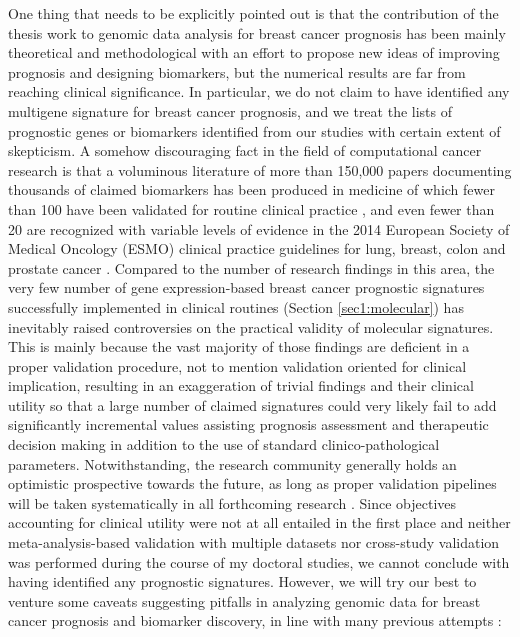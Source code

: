One thing that needs to be explicitly pointed out is that the contribution of the thesis work to genomic data analysis for breast cancer prognosis has been mainly theoretical and methodological with an effort to propose new ideas of improving prognosis and designing biomarkers, but the numerical results are far from reaching clinical significance. In particular, we do not claim to have identified any multigene signature for breast cancer prognosis, and we treat the lists of prognostic genes or biomarkers identified from our studies with certain extent of skepticism. A somehow discouraging fact in the field of computational cancer research is that a voluminous literature of more than 150,000 papers documenting thousands of claimed biomarkers has been produced in medicine of which fewer than 100 have been validated for routine clinical practice \cite{Poste2011Bring}, and even fewer than 20 are recognized with variable levels of evidence in the 2014 European Society of Medical Oncology (ESMO) clinical practice guidelines for lung, breast, colon and prostate cancer \cite{Schneider2015Establishing}. Compared to the number of research findings in this area, the very few number of gene expression-based breast cancer prognostic signatures successfully implemented in clinical routines (Section \ref{sec1:molecular}) has inevitably raised controversies on the practical validity of molecular signatures. This is mainly because the vast majority of those findings are deficient in a proper validation procedure, not to mention validation oriented for clinical implication, resulting in an exaggeration of trivial findings and their clinical utility so that a large number of claimed signatures could very likely fail to add significantly incremental values assisting prognosis assessment and therapeutic decision making in addition to the use of standard clinico-pathological parameters. Notwithstanding, the research community generally holds an optimistic prospective towards the future, as long as proper validation pipelines will be taken systematically in all forthcoming research \cite{Michiels2016Statistical}. Since objectives accounting for clinical utility were not at all entailed in the first place and neither meta-analysis-based validation with multiple datasets nor cross-study validation was performed during the course of my doctoral studies, we cannot conclude with having identified any prognostic signatures. However, we will try our best to venture some caveats suggesting pitfalls in analyzing genomic data for breast cancer prognosis and biomarker discovery, in line with many previous attempts \cite{Ambroise2002Selection, Simon2003Pitfalls}:


